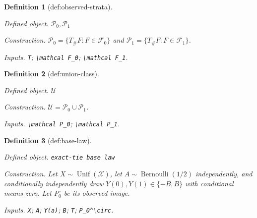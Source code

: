 \documentclass{article}
\newtheorem{definition}{Definition}
\begin{document}
\begin{definition}[def:observed-strata]\label{def:observed-strata}
\par\smallskip\noindent\emph{Defined object.} \(\mathcal P_0,\mathcal P_1\)
\par\smallskip\noindent\emph{Construction.} \(\mathcal P_0=\{T_\#F:F\in\mathcal F_0\}\) and \(\mathcal P_1=\{T_\#F:F\in\mathcal F_1\}\).
\par\smallskip\noindent\emph{Inputs.} \texttt{T}; \texttt{\textbackslash{}\allowbreak{}mathcal F\_\allowbreak{}0}; \texttt{\textbackslash{}\allowbreak{}mathcal F\_\allowbreak{}1}.
\end{definition}

\begin{definition}[def:union-class]\label{def:union-class}
\par\smallskip\noindent\emph{Defined object.} \(\mathcal U\)
\par\smallskip\noindent\emph{Construction.} \(\mathcal U=\mathcal P_0\cup\mathcal P_1\).
\par\smallskip\noindent\emph{Inputs.} \texttt{\textbackslash{}\allowbreak{}mathcal P\_\allowbreak{}0}; \texttt{\textbackslash{}\allowbreak{}mathcal P\_\allowbreak{}1}.
\end{definition}

\begin{definition}[def:base-law]\label{def:base-law}
\par\smallskip\noindent\emph{Defined object.} \texttt{exact-\allowbreak{}tie base law}
\par\smallskip\noindent\emph{Construction.} Let \(X\sim\operatorname{Unif}(\mathcal X)\), let \(A\sim\operatorname{Bernoulli}(1/2)\) independently, and conditionally independently draw \(Y(0),Y(1)\in\{-B,B\}\) with conditional means zero.  Let \(P_0^\circ\) be its observed image.
\par\smallskip\noindent\emph{Inputs.} \texttt{X}; \texttt{A}; \texttt{Y(a)}; \texttt{B}; \texttt{T}; \texttt{P\_\allowbreak{}0\textasciicircum{}\textbackslash{}\allowbreak{}circ}.
\end{definition}
\end{document}
